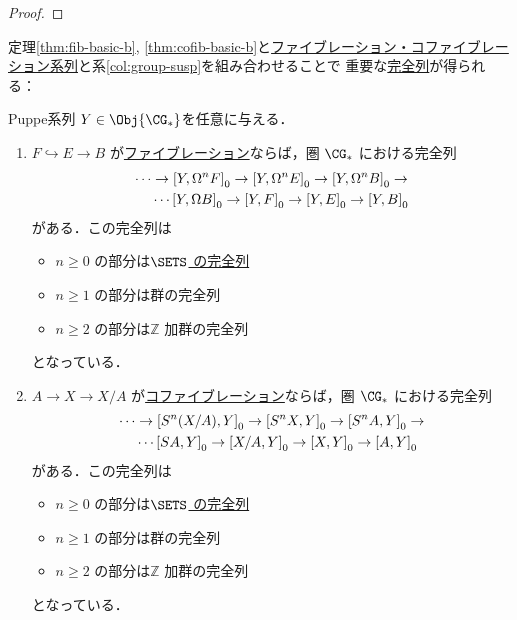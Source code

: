 \documentclass[algtopo_main]{subfiles}
\begin{document}
\begin{proof}
    
\end{proof}


定理\ref{thm:fib-basic-b}, \ref{thm:cofib-basic-b}と\hyperref[thm:fib-seq]{ファイブレーション・コファイブレーション系列}と系\ref{col:group-susp}を組み合わせることで
重要な\hyperref[def:ES-SETS]{完全列}が得られる：

\begin{mytheo}[label=ES:Puppe, breakable]{Puppe系列}
    $Y \in \Obj{\CG_*}$を任意に与える．
    \begin{enumerate}
        \item $F \hookrightarrow E \to B$ が\hyperref[def:fibration]{ファイブレーション}ならば，圏 $\CG_*$ における完全列
        \begin{align}
            \cdots &\to \comm{Y}{\Omega^n F}_0 \to \comm{Y}{\Omega^n E}_0 \to \comm{Y}{\Omega^nB}_0 \to \\
            &\cdots \comm{Y}{\Omega B}_0 \to \comm{Y}{F}_0 \to \comm{Y}{E}_0 \to \comm{Y}{B}_0
        \end{align}
        がある．この完全列は
        \begin{itemize}
            \item $n \ge 0$ の部分は\hyperref[def:ES-SETS]{$\SETS$ の完全列}
            \item $n \ge 1$ の部分は群の完全列
            \item $n \ge 2$ の部分は$\mathbb{Z}$ 加群の完全列
        \end{itemize}
        となっている．
        \item $A \to X \to X/A$ が\hyperref[def:cofibration]{コファイブレーション}ならば，圏 $\CG_*$ における完全列
        \begin{align}
            \cdots &\to \comm{S^n(X/A)}{Y}_0 \to \comm{S^n X}{Y}_0 \to \comm{S^n A}{Y}_0 \to \\
            &\cdots \comm{SA}{Y}_0 \to \comm{X/A}{Y}_0 \to \comm{X}{Y}_0 \to \comm{A}{Y}_0
        \end{align}
        がある．この完全列は
        \begin{itemize}
            \item $n \ge 0$ の部分は\hyperref[def:ES-SETS]{$\SETS$ の完全列}
            \item $n \ge 1$ の部分は群の完全列
            \item $n \ge 2$ の部分は$\mathbb{Z}$ 加群の完全列
        \end{itemize}
        となっている．
    \end{enumerate}
\end{mytheo}
\end{document}
